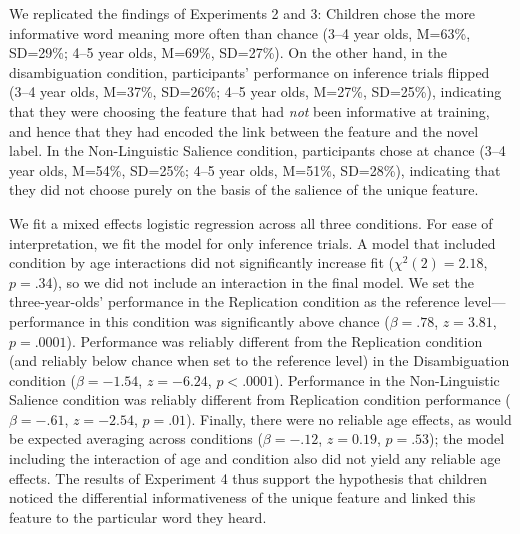 \documentclass[man,noapacite]{apa2}
\begin{document}

We replicated the findings of Experiments 2 and 3: Children chose the more informative word meaning more often than chance (3--4 year olds, M=63\%, SD=29\%; 4--5 year olds, M=69\%, SD=27\%). On the other hand, in the disambiguation condition, participants' performance on inference trials flipped  (3--4 year olds, M=37\%, SD=26\%; 4--5 year olds, M=27\%, SD=25\%), indicating that they were choosing the feature that had \emph{not} been informative at training, and hence that they had encoded the link between the feature and the novel label. In the Non-Linguistic Salience condition, participants chose at chance  (3--4 year olds, M=54\%, SD=25\%; 4--5 year olds, M=51\%, SD=28\%), indicating that they did not choose purely on the basis of the salience of the unique feature. 


We fit a mixed effects logistic regression across all three conditions. For ease of interpretation, we fit the model for only inference trials. A model that included condition by age interactions did not significantly increase fit ($\chi^2(2)=2.18$, $p = .34$), so we did not include an interaction in the final model. We set the three-year-olds' performance in the Replication condition as the reference level---performance in this condition was significantly above chance ($\beta=.78$, $z=3.81$, $p=.0001$). Performance was reliably different from the Replication condition (and reliably below chance when set to the reference level) in the Disambiguation condition ($\beta=-1.54$, $z=-6.24$, $p<.0001$). Performance in the Non-Linguistic Salience condition was reliably different from Replication condition performance ($\beta=-.61$, $z=-2.54$, $p=.01$). Finally, there were no reliable age effects, as would be expected averaging across conditions ($\beta=-.12$, $z=0.19$, $p=.53$); the model including the interaction of age and condition also did not yield any reliable age effects. The results of Experiment 4 thus support the hypothesis that children noticed the differential informativeness of the unique feature and linked this feature to the particular word they heard. 
\end{document}
